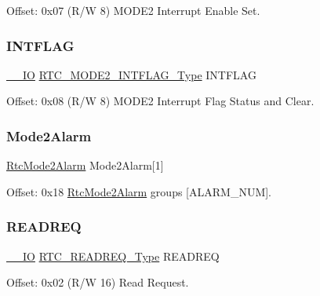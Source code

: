 Offset\+: 0x07 (R/W 8) M\+O\+D\+E2 Interrupt Enable Set. 

\mbox{\label{struct_rtc_mode2_a98dc62afc11df4cca24babb393af06dc}} 
\subsubsection{\texorpdfstring{INTFLAG}{INTFLAG}}
{\footnotesize\ttfamily \mbox{\hyperlink{core__cm0plus_8h_aec43007d9998a0a0e01faede4133d6be}{\+\_\+\+\_\+\+IO}} \mbox{\hyperlink{union_r_t_c___m_o_d_e2___i_n_t_f_l_a_g___type}{R\+T\+C\+\_\+\+M\+O\+D\+E2\+\_\+\+I\+N\+T\+F\+L\+A\+G\+\_\+\+Type}} I\+N\+T\+F\+L\+AG}



Offset\+: 0x08 (R/W 8) M\+O\+D\+E2 Interrupt Flag Status and Clear. 

\mbox{\label{struct_rtc_mode2_a9da280aa59724fb4a83265239b9d214e}} 
\subsubsection{\texorpdfstring{Mode2Alarm}{Mode2Alarm}}
{\footnotesize\ttfamily \mbox{\hyperlink{struct_rtc_mode2_alarm}{Rtc\+Mode2\+Alarm}} Mode2\+Alarm\mbox{[}1\mbox{]}}



Offset\+: 0x18 \mbox{\hyperlink{struct_rtc_mode2_alarm}{Rtc\+Mode2\+Alarm}} groups \mbox{[}A\+L\+A\+R\+M\+\_\+\+N\+UM\mbox{]}. 

\mbox{\label{struct_rtc_mode2_aa1779f0fc09662a56db255c1637c56c0}} 
\subsubsection{\texorpdfstring{READREQ}{READREQ}}
{\footnotesize\ttfamily \mbox{\hyperlink{core__cm0plus_8h_aec43007d9998a0a0e01faede4133d6be}{\+\_\+\+\_\+\+IO}} \mbox{\hyperlink{union_r_t_c___r_e_a_d_r_e_q___type}{R\+T\+C\+\_\+\+R\+E\+A\+D\+R\+E\+Q\+\_\+\+Type}} R\+E\+A\+D\+R\+EQ}



Offset\+: 0x02 (R/W 16) Read Request. 

